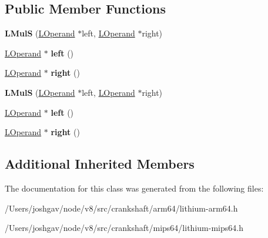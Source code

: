 \subsection*{Public Member Functions}
\begin{DoxyCompactItemize}
\item 
{\bfseries L\+MulS} (\hyperlink{classv8_1_1internal_1_1_l_operand}{L\+Operand} $\ast$left, \hyperlink{classv8_1_1internal_1_1_l_operand}{L\+Operand} $\ast$right)\hypertarget{classv8_1_1internal_1_1_l_mul_s_add3a32458f5dd279a9b4c5bf26c7cca6}{}\label{classv8_1_1internal_1_1_l_mul_s_add3a32458f5dd279a9b4c5bf26c7cca6}

\item 
\hyperlink{classv8_1_1internal_1_1_l_operand}{L\+Operand} $\ast$ {\bfseries left} ()\hypertarget{classv8_1_1internal_1_1_l_mul_s_ac38bce8db519270c7a08018ed827cdea}{}\label{classv8_1_1internal_1_1_l_mul_s_ac38bce8db519270c7a08018ed827cdea}

\item 
\hyperlink{classv8_1_1internal_1_1_l_operand}{L\+Operand} $\ast$ {\bfseries right} ()\hypertarget{classv8_1_1internal_1_1_l_mul_s_a4b2a8fff842afd1aec63ad31a72e0c05}{}\label{classv8_1_1internal_1_1_l_mul_s_a4b2a8fff842afd1aec63ad31a72e0c05}

\item 
{\bfseries L\+MulS} (\hyperlink{classv8_1_1internal_1_1_l_operand}{L\+Operand} $\ast$left, \hyperlink{classv8_1_1internal_1_1_l_operand}{L\+Operand} $\ast$right)\hypertarget{classv8_1_1internal_1_1_l_mul_s_add3a32458f5dd279a9b4c5bf26c7cca6}{}\label{classv8_1_1internal_1_1_l_mul_s_add3a32458f5dd279a9b4c5bf26c7cca6}

\item 
\hyperlink{classv8_1_1internal_1_1_l_operand}{L\+Operand} $\ast$ {\bfseries left} ()\hypertarget{classv8_1_1internal_1_1_l_mul_s_ac38bce8db519270c7a08018ed827cdea}{}\label{classv8_1_1internal_1_1_l_mul_s_ac38bce8db519270c7a08018ed827cdea}

\item 
\hyperlink{classv8_1_1internal_1_1_l_operand}{L\+Operand} $\ast$ {\bfseries right} ()\hypertarget{classv8_1_1internal_1_1_l_mul_s_a4b2a8fff842afd1aec63ad31a72e0c05}{}\label{classv8_1_1internal_1_1_l_mul_s_a4b2a8fff842afd1aec63ad31a72e0c05}

\end{DoxyCompactItemize}
\subsection*{Additional Inherited Members}


The documentation for this class was generated from the following files\+:\begin{DoxyCompactItemize}
\item 
/\+Users/joshgav/node/v8/src/crankshaft/arm64/lithium-\/arm64.\+h\item 
/\+Users/joshgav/node/v8/src/crankshaft/mips64/lithium-\/mips64.\+h\end{DoxyCompactItemize}
